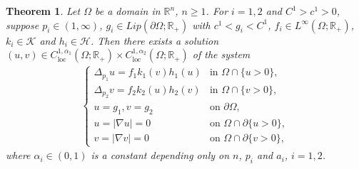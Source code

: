 \documentclass[11pt,oneside,english]{amsart}
\newcommand{\R}{{\mathbb R}}
\newcommand{\cK}{{\mathcal K}}
\newcommand{\cH}{{\mathcal H}}
\newcommand{\al}{\alpha}
\newcommand{\loc}{\operatorname{loc}}
\newcommand{\D}{\nabla}
\numberwithin{equation}{section}
\newtheorem{theorem}{Theorem}
\theoremstyle{plain}
\numberwithin{equation}{section}
\begin{document}
\begin{theorem}
    \label{thm:p-Lapl}
Let $\Omega$ be a domain in $\R^n$, $n\ge1$. For $i=1,2$ and $C^1>c^1>0$, suppose $p_i\in (1,\infty)$, $g_i\in Lip(\partial\Omega;\R_+)$ with $c^1<g_i<C^1$, $f_i\in L^\infty(\Omega;\R_+)$, $k_i\in \cK$ and $h_i\in \cH$. Then there exists a solution $(u,v)\in C^{1,\al_1}_{\loc}(\Omega;\R_+)\times C^{1,\al_2}_{\loc}(\Omega;\R_+)$ of the system
\begin{align}\label{system:plaplacian}
    \begin{cases}
        \Delta_{p_1}u=f_1k_1(v)h_1(u)&\text{in }\Omega\cap\{u>0\},\\
        \Delta_{p_2}v=f_2k_2(u)h_2(v)&\text{in }\Omega\cap\{v>0\},\\
        u=g_1,v=g_2&\text{on }\partial\Omega,\\
        u=|\D u|=0&\text{on }\Omega\cap\partial\{u>0\},\\
        v=|\D v|=0&\text{on }\Omega\cap\partial\{v>0\},
    \end{cases}
\end{align}
where $\al_i\in (0,1)$ is a constant depending only on $n$, $p_i$ and $a_i$, $i=1,2$.
\end{theorem}
\end{document}
